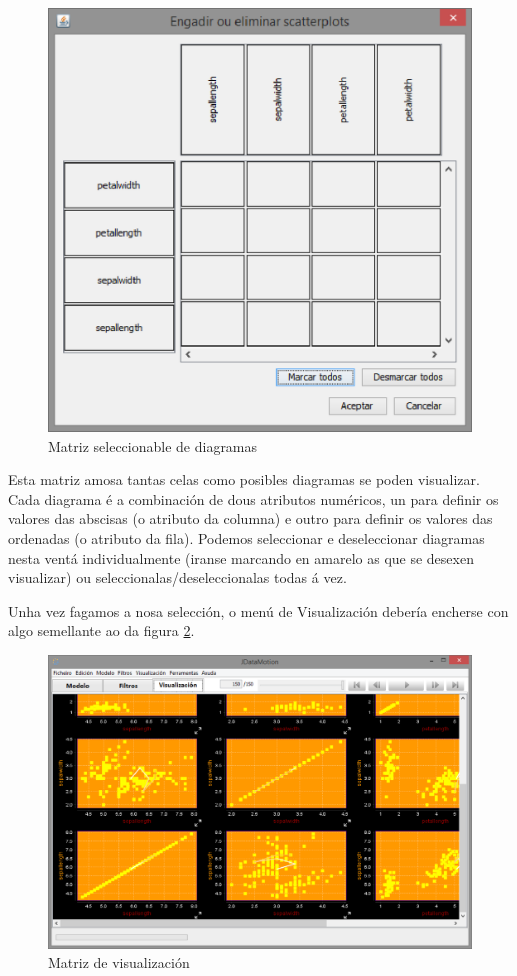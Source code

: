 \begin{figure}
\centering
\includegraphics[width=\textwidth,height=\textheight,keepaspectratio]{figuras/matrizVisualizacion}
\caption{Matriz seleccionable de diagramas}
\label{matrizVisualizacion}
\end{figure}

Esta matriz amosa tantas celas como posibles diagramas se poden visualizar. Cada diagrama é a combinación de dous atributos numéricos, un para definir os valores das abscisas (o atributo da columna) e outro para definir os valores das ordenadas (o atributo da fila). Podemos seleccionar e deseleccionar diagramas nesta ventá individualmente (iranse marcando en amarelo as que se desexen visualizar) ou seleccionalas/deseleccionalas todas á vez.

Unha vez fagamos a nosa selección, o menú de Visualización debería encherse con algo semellante ao da figura \ref{matrizChea}.

\begin{figure}
\centering
\includegraphics[width=\textwidth,height=\textheight,keepaspectratio]{figuras/matrizChea}
\caption{Matriz de visualización}
\label{matrizChea}
\end{figure}


